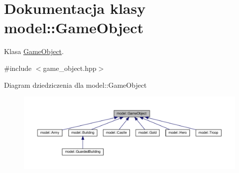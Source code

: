 \hypertarget{classmodel_1_1GameObject}{}\section{Dokumentacja klasy model\+:\+:Game\+Object}
\label{classmodel_1_1GameObject}


Klasa \hyperlink{classmodel_1_1GameObject}{Game\+Object}.  




{\ttfamily \#include $<$game\+\_\+object.\+hpp$>$}



Diagram dziedziczenia dla model\+:\+:Game\+Object\nopagebreak
\begin{figure}[H]
\begin{center}
\leavevmode
\includegraphics[width=350pt]{classmodel_1_1GameObject__inherit__graph}
\end{center}
\end{figure}
